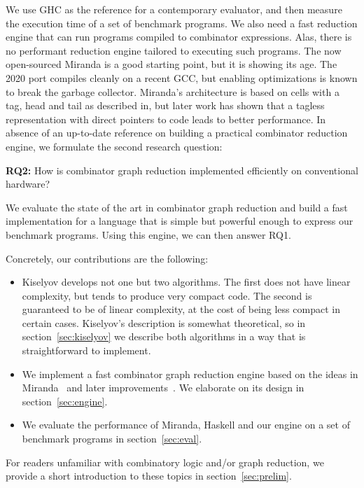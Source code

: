 \documentclass[conference]{IEEEtran}
\begin{document}
We use GHC as the reference for a contemporary evaluator, and then measure the execution time of a set of benchmark programs.
We also need a fast reduction engine that can run programs compiled to combinator expressions.
Alas, there is no performant reduction engine tailored to executing such programs.
The now open-sourced Miranda is a good starting point, but it is showing its age.
The 2020 port compiles cleanly on a recent GCC, but enabling optimizations is known to break the garbage collector.
Miranda's architecture is based on cells with a tag, head and tail as described in\cite{turner_new_1979}, but later work has shown that a tagless representation with direct pointers to code leads to better performance\cite{koopman_fresh_1989}.
In absence of an up-to-date reference on building a practical combinator reduction engine, we formulate the second research question:

\textbf{RQ2:} How is combinator graph reduction implemented efficiently on conventional hardware?

We evaluate the state of the art in combinator graph reduction and build a fast implementation for a language that is simple but powerful enough to express our benchmark programs.
Using this engine, we can then answer RQ1.

Concretely, our contributions are the following:
\begin{itemize}
    \item Kiselyov develops not one but two algorithms. The first does not have linear complexity, but tends to produce very compact code.
          The second is guaranteed to be of linear complexity, at the cost of being less compact in certain cases.
          Kiselyov's description is somewhat theoretical, so in section~\ref{sec:kiselyov} we describe both algorithms in a way that is straightforward to implement.
    \item We implement a fast combinator graph reduction engine based on the ideas in Miranda~\cite{turner_miranda_1985} and later improvements~\cite{koopman_architecture_1992}.
          We elaborate on its design in section~\ref{sec:engine}.
    \item We evaluate the performance of Miranda, Haskell and our engine on a set of benchmark programs in section~\ref{sec:eval}.
\end{itemize}

For readers unfamiliar with combinatory logic and/or graph reduction, we provide a short introduction to these topics in section~\ref{sec:prelim}.
\end{document}
